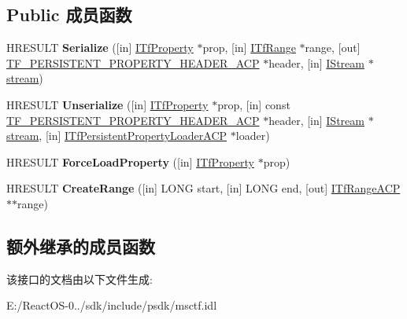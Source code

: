 \subsection*{Public 成员函数}
\begin{DoxyCompactItemize}
\item 
\mbox{\label{interface_i_text_store_a_c_p_services_a9cdb913e79c7c6fd2d80f195efa31adc}} 
H\+R\+E\+S\+U\+LT {\bfseries Serialize} (\mbox{[}in\mbox{]} \hyperlink{interface_i_tf_property}{I\+Tf\+Property} $\ast$prop, \mbox{[}in\mbox{]} \hyperlink{interface_i_tf_range}{I\+Tf\+Range} $\ast$range, \mbox{[}out\mbox{]} \hyperlink{struct_t_f___p_e_r_s_i_s_t_e_n_t___p_r_o_p_e_r_t_y___h_e_a_d_e_r___a_c_p}{T\+F\+\_\+\+P\+E\+R\+S\+I\+S\+T\+E\+N\+T\+\_\+\+P\+R\+O\+P\+E\+R\+T\+Y\+\_\+\+H\+E\+A\+D\+E\+R\+\_\+\+A\+CP} $\ast$header, \mbox{[}in\mbox{]} \hyperlink{interface_i_stream}{I\+Stream} $\ast$\hyperlink{structstream}{stream})
\item 
\mbox{\label{interface_i_text_store_a_c_p_services_a98f2d1f9a55b84339b5d752c0a14a3c1}} 
H\+R\+E\+S\+U\+LT {\bfseries Unserialize} (\mbox{[}in\mbox{]} \hyperlink{interface_i_tf_property}{I\+Tf\+Property} $\ast$prop, \mbox{[}in\mbox{]} const \hyperlink{struct_t_f___p_e_r_s_i_s_t_e_n_t___p_r_o_p_e_r_t_y___h_e_a_d_e_r___a_c_p}{T\+F\+\_\+\+P\+E\+R\+S\+I\+S\+T\+E\+N\+T\+\_\+\+P\+R\+O\+P\+E\+R\+T\+Y\+\_\+\+H\+E\+A\+D\+E\+R\+\_\+\+A\+CP} $\ast$header, \mbox{[}in\mbox{]} \hyperlink{interface_i_stream}{I\+Stream} $\ast$\hyperlink{structstream}{stream}, \mbox{[}in\mbox{]} \hyperlink{interface_i_tf_persistent_property_loader_a_c_p}{I\+Tf\+Persistent\+Property\+Loader\+A\+CP} $\ast$loader)
\item 
\mbox{\label{interface_i_text_store_a_c_p_services_aa2757c6d9f0e682683d216744ec012dd}} 
H\+R\+E\+S\+U\+LT {\bfseries Force\+Load\+Property} (\mbox{[}in\mbox{]} \hyperlink{interface_i_tf_property}{I\+Tf\+Property} $\ast$prop)
\item 
\mbox{\label{interface_i_text_store_a_c_p_services_ad8ee5f6798c816d887fc681944496e0f}} 
H\+R\+E\+S\+U\+LT {\bfseries Create\+Range} (\mbox{[}in\mbox{]} L\+O\+NG start, \mbox{[}in\mbox{]} L\+O\+NG end, \mbox{[}out\mbox{]} \hyperlink{interface_i_tf_range_a_c_p}{I\+Tf\+Range\+A\+CP} $\ast$$\ast$range)
\end{DoxyCompactItemize}
\subsection*{额外继承的成员函数}


该接口的文档由以下文件生成\+:\begin{DoxyCompactItemize}
\item 
E\+:/\+React\+O\+S-\/0../sdk/include/psdk/msctf.\+idl\end{DoxyCompactItemize}
